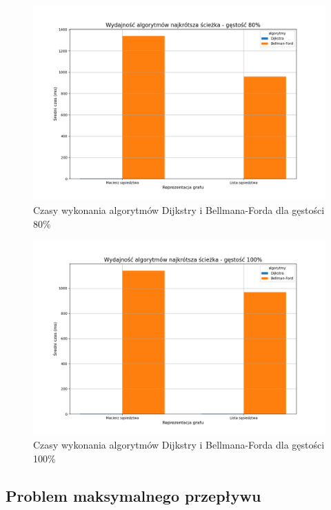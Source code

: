 \documentclass{article}
\begin{document}
\begin{figure}[H]
    \centering
    \includegraphics[scale=0.5]{../Python/charts_type2/Typ2_SHORTEST_PATH_gestosc80_wykres.png}
    \caption{Czasy wykonania algorytmów Dijkstry i Bellmana-Forda dla gęstości 80\%}
\end{figure}

\begin{figure}[H]
    \centering
    \includegraphics[scale=0.5]{../Python/charts_type2/Typ2_SHORTEST_PATH_gestosc100_wykres.png}
    \caption{Czasy wykonania algorytmów Dijkstry i Bellmana-Forda dla gęstości 100\%}
\end{figure}

\subsection{Problem maksymalnego przepływu}
\end{document}
